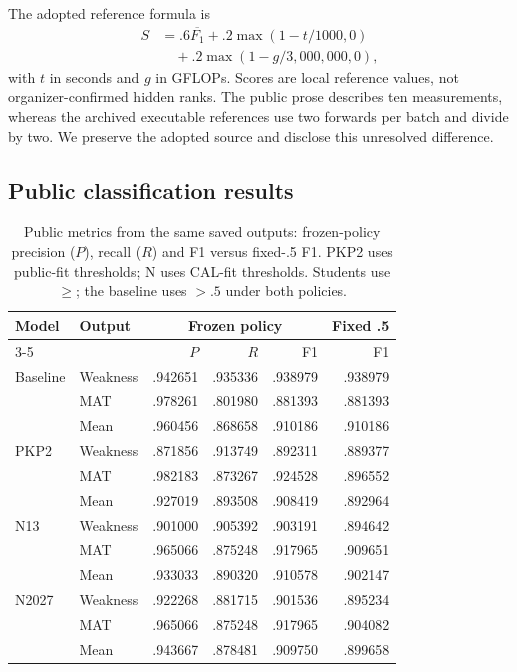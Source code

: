 \documentclass[10pt,conference]{IEEEtran}
\begin{document}
The adopted reference formula is
\begin{align}
 S&=.6\overline{F_1}+.2\max(1-t/1000,0)\nonumber\\
  &\quad+.2\max(1-g/3{,}000{,}000,0),
\end{align}
with $t$ in seconds and $g$ in GFLOPs. Scores are local reference values, not organizer-confirmed hidden ranks. The public prose describes ten measurements, whereas the archived executable references use two forwards per batch and divide by two. We preserve the adopted source and disclose this unresolved difference.

\subsection{Public classification results}
\begin{table}[t]
\centering
\caption{Public metrics from the same saved outputs: frozen-policy precision ($P$), recall ($R$) and F1 versus fixed-.5 F1. PKP2 uses public-fit thresholds; N uses CAL-fit thresholds. Students use $\geq$; the baseline uses $>.5$ under both policies.}
\label{tab:metrics}
\small
\setlength{\tabcolsep}{3pt}
\begin{tabular}{@{}llrrrr@{}}
\toprule
Model & Output & \multicolumn{3}{c}{Frozen policy} & Fixed .5\\
\cmidrule(lr){3-5}
 & & $P$ & $R$ & F1 & F1\\
\midrule
Baseline & Weakness & .942651 & .935336 & .938979 & .938979\\
         & MAT      & .978261 & .801980 & .881393 & .881393\\
         & Mean     & .960456 & .868658 & .910186 & .910186\\
PKP2     & Weakness & .871856 & .913749 & .892311 & .889377\\
         & MAT      & .982183 & .873267 & .924528 & .896552\\
         & Mean     & .927019 & .893508 & .908419 & .892964\\
N13      & Weakness & .901000 & .905392 & .903191 & .894642\\
         & MAT      & .965066 & .875248 & .917965 & .909651\\
         & Mean     & .933033 & .890320 & .910578 & .902147\\
N2027    & Weakness & .922268 & .881715 & .901536 & .895234\\
         & MAT      & .965066 & .875248 & .917965 & .904082\\
         & Mean     & .943667 & .878481 & .909750 & .899658\\
\bottomrule
\end{tabular}
\end{table}
\end{document}
